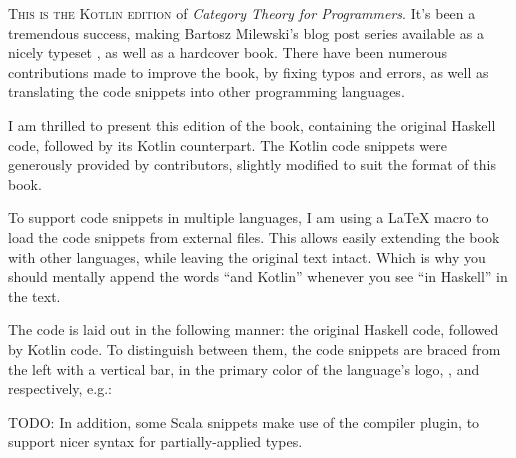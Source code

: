 
\lettrine[lhang=0.17]{T}{his is the Kotlin edition} of \emph{Category Theory for Programmers}.
It's been a tremendous success, making Bartosz Milewski's blog post series available as a nicely 
typeset , as well as a hardcover book. There have been numerous contributions made
to improve the book, by fixing typos and errors, as well as translating the code snippets into
other programming languages.

I am thrilled to present this edition of the book, containing the original Haskell code, followed by
its Kotlin counterpart. The Kotlin code snippets were generously provided by 
 contributors, slightly 
modified to suit the format of this book.

To support code snippets in multiple languages, I am using a \LaTeX{} macro to load the code snippets
from external files. This allows easily extending the book with other languages, while leaving the 
original text intact. Which is why you should mentally append the words ``and Kotlin'' whenever you see
``in Haskell'' in the text.

The code is laid out in the following manner: the original Haskell code, followed by Kotlin code.
To distinguish between them, the code snippets are braced from the left with a vertical bar, in the primary
color of the language's logo, , 
and  respectively, e.g.:

\unskip
{}
\NoIndentAfterThis
TODO: In addition, some Scala snippets make use of the 
 compiler plugin, to support nicer syntax for partially-applied types.
